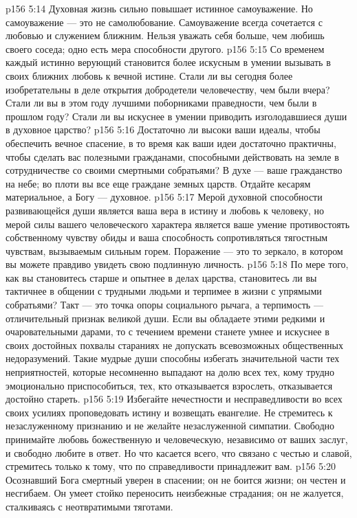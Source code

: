 \vs p156 5:14 Духовная жизнь сильно повышает истинное самоуважение. Но самоуважение --- это не самолюбование. Самоуважение всегда сочетается с любовью и служением ближним. Нельзя уважать себя больше, чем любишь своего соседа; одно есть мера способности другого.
\vs p156 5:15 Со временем каждый истинно верующий становится более искусным в умении вызывать в своих ближних любовь к вечной истине. Стали ли вы сегодня более изобретательны в деле открытия добродетели человечеству, чем были вчера? Стали ли вы в этом году лучшими поборниками праведности, чем были в прошлом году? Стали ли вы искуснее в умении приводить изголодавшиеся души в духовное царство?
\vs p156 5:16 Достаточно ли высоки ваши идеалы, чтобы обеспечить вечное спасение, в то время как ваши идеи достаточно практичны, чтобы сделать вас полезными гражданами, способными действовать на земле в сотрудничестве со своими смертными собратьями? В духе --- ваше гражданство на небе; во плоти вы все еще граждане земных царств. Отдайте кесарям материальное, а Богу --- духовное.
\vs p156 5:17 Мерой духовной способности развивающейся души является ваша вера в истину и любовь к человеку, но мерой силы вашего человеческого характера является ваше умение противостоять собственному чувству обиды и ваша способность сопротивляться тягостным чувствам, вызываемым сильным горем. Поражение --- это то зеркало, в котором вы можете правдиво увидеть свою подлинную личность.
\vs p156 5:18 По мере того, как вы становитесь старше и опытнее в делах царства, становитесь ли вы тактичнее в общении с трудными людьми и терпимее в жизни с упрямыми собратьями? Такт --- это точка опоры социального рычага, а терпимость --- отличительный признак великой души. Если вы обладаете этими редкими и очаровательными дарами, то с течением времени станете умнее и искуснее в своих достойных похвалы стараниях не допускать всевозможных общественных недоразумений. Такие мудрые души способны избегать значительной части тех неприятностей, которые несомненно выпадают на долю всех тех, кому трудно эмоционально приспособиться, тех, кто отказывается взрослеть, отказывается достойно стареть.
\vs p156 5:19 Избегайте нечестности и несправедливости во всех своих усилиях проповедовать истину и возвещать евангелие. Не стремитесь к незаслуженному признанию и не желайте незаслуженной симпатии. Свободно принимайте любовь божественную и человеческую, независимо от ваших заслуг, и свободно любите в ответ. Но что касается всего, что связано с честью и славой, стремитесь только к тому, что по справедливости принадлежит вам.
\vs p156 5:20 Осознавший Бога смертный уверен в спасении; он не боится жизни; он честен и несгибаем. Он умеет стойко переносить неизбежные страдания; он не жалуется, сталкиваясь с неотвратимыми тяготами.
